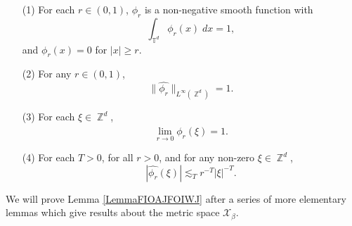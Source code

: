 \documentclass[dvipsnames,letterpaper,12pt]{article}
\numberwithin{equation}{section}
\DeclareMathOperator{\ZZ}{\mathbb{Z}}
\DeclareMathOperator{\TT}{\mathbb{T}}
\numberwithin{theorem}{section}
\begin{document}
\begin{enumerate}
    \item[(1)] For each $r \in (0,1)$, $\phi_r$ is a non-negative smooth function with
    \begin{equation}
        \int_{\TT^d} \phi_r(x)\; dx = 1,
    \end{equation}
    and $\phi_r(x) = 0$ for $|x| \geq r$.

    \item[(2)] For any $r \in (0,1)$,
    \begin{equation} \label{equationDIOJAOIJVIV23242}
        \| \widehat{\phi_r} \|_{L^\infty(\ZZ^d)} = 1.
    \end{equation}


    \item[(3)] For each $\xi \in \ZZ^d$,
    \begin{equation} \label{approximationtoidentitypointwiseconvergence}
        \lim_{r \to 0} \widehat{\phi_r}(\xi) = 1.
    \end{equation}

    \item[(4)] For each $T > 0$, for all $r > 0$, and for any non-zero $\xi \in \ZZ^d$,
    \begin{equation} \label{molificationdecaybound}
        |\widehat{\phi_r}(\xi)| \lesssim_T r^{-T} |\xi|^{-T}.
    \end{equation}
\end{enumerate}
%
We will prove Lemma \ref{LemmaFIOAJFOIWJ} after a series of more elementary lemmas which give results about the metric space $\mathcal{X}_\beta$.
\end{document}
